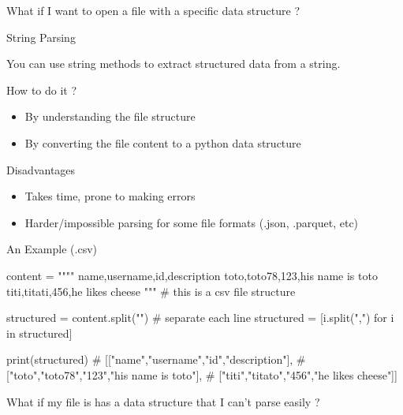 \documentclass[serif, aspectratio=169]{beamer}
\begin{document}
\begin{exoframe}
    \begin{center}
        \Large
        What if I want to open a file with a specific data structure ?
    \end{center}
\end{exoframe}

\begin{frame}{String Parsing}
    \begin{center}
        \Large
        You can use string methods to extract structured data from a string.
    \end{center}
    \begin{block}{How to do it ?}
        \begin{itemize}
            \item By understanding the file structure
            \item By converting the file content to a python data structure
        \end{itemize}
    \end{block}
    \begin{block}{Disadvantages}
        \begin{itemize}
            \item Takes time, prone to making errors
            \item Harder/impossible parsing for some file formats (.json, .parquet, etc)
        \end{itemize}
    \end{block}
\end{frame}

\begin{frame}[fragile]{An Example (.csv)}
    \begin{pythoncode}
    content = """"
    name,username,id,description
    toto,toto78,123,his name is toto
    titi,titati,456,he likes cheese
    """ # this is a csv file structure

    structured = content.split("\n") # separate each line
    structured = [i.split(",") for i in structured]

    print(structured)
    # [["name","username","id","description"],
    #  ["toto","toto78","123","his name is toto"],
    #  ["titi","titato","456","he likes cheese"]]
    \end{pythoncode}
\end{frame}

\begin{exoframe}
    \begin{center}
        \Large
        What if my file is has a data structure that I can't parse easily ?
    \end{center}
\end{exoframe}
\end{document}
